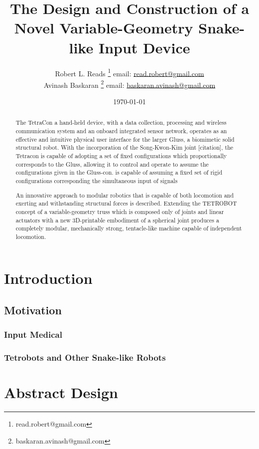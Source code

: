 \documentclass[11pt]{article}
\title{The Design and Construction of a Novel Variable-Geometry Snake-like Input Device}
\author{Robert L. Reads
  \thanks{read.robert@gmail.com}
  email: \href{mailto:read.robert@gmail.com}{read.robert@gmail.com}\\
Avinash Baskaran
  \thanks{baskaran.avinash@gmail.com}
  email: \href{mailto:Baskaran.avinash@gmail.com}{baskaran.avinash@gmail.com}
  }
\affil{Public Invention, an educational non-profit.}
\date{\today}
\begin{document}
\maketitle


\begin{abstract}

  The TetraCon a hand-held device, with a data collection, processing and wireless
  communication system and an onboard integrated sensor network, operates as an
  effective and intuitive physical user interface for the larger Gluss, a biomimetic solid structural robot.
  With the incorporation of the Song-Kwon-Kim joint [citation], the
  Tetracon is capable of adopting a set of fixed configurations which proportionally corresponds to the Gluss, allowing it to control
  and operate to assume the configurations given in the Gluss-con. is capable of assuming a fixed set of rigid configurations
  corresponding the simultaneous input of signals


  An innovative approach to modular robotics that is capable of both locomotion and exerting and
  withstanding structural forces is described.
  Extending the TETROBOT\cite{sanderson1996modular,lee2002dynamic,lee1999dynamics,TetrobotBook}
  concept of a variable-geometry
  truss which is composed only of joints and linear actuators
  with a new 3D-printable embodiment of a
  spherical joint\cite{song2003spherical}
  produces a completely modular, mechanically strong, tentacle-like machine capable of independent locomotion.
\end{abstract}


\section{Introduction}

\subsection{Motivation}
\subsubsection{Input Medical}
\subsubsection{Tetrobots and Other Snake-like Robots}

\section{Abstract Design}
\end{document}
